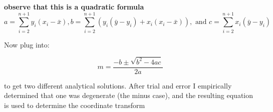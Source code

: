 \documentclass{article}
\begin{document}
\textbf{observe that this is a quadratic formula}
$$a = \sum_{i=2}^{n+1}y_i(x_i - \bar{x}), b = \sum_{i=2}^{n+1}(y_i(\bar{y} -y_i) + x_i(x_i - \bar{x})), \text{ and } c = \sum_{i=2}^{n+1}x_i(\bar{y} -y_i)$$

Now plug into:

$$ m = \frac{-b \pm \sqrt{b^2 - 4ac}}{2a}$$

to get two different analytical solutions. After trial and error I empirically determined that one was degenerate (the minus case), and the resulting equation is used to determine the coordinate transform
\end{document}
